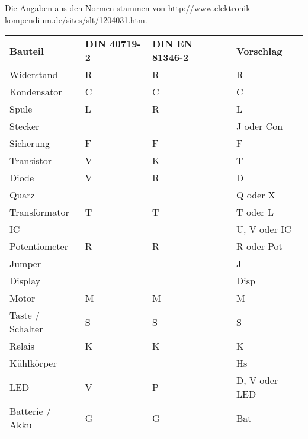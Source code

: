Die Angaben aus den Normen stammen von 
\url{http://www.elektronik-kompendium.de/sites/slt/1204031.htm}. 
\begin{table}[h!]
  \begin{tabular}{llll}
  \rowcolor{white}  \textbf{Bauteil} 	    
                                            & \textbf{DIN 40719-2} 
                                                    & \textbf{DIN EN 81346-2}          
                                                            & \textbf{Vorschlag}\\
  \rowcolor{lgray}  Widerstand              & R     & R     & R \\
  \rowcolor{white}  Kondensator             & C     & C     & C \\
  \rowcolor{lgray}  Spule                   & L     & R     & L \\
  \rowcolor{white}  Stecker                 &       &       & J oder Con \\
  \rowcolor{lgray}  Sicherung               & F     & F     & F \\
  \rowcolor{white}  Transistor              & V     & K     & T \\
  \rowcolor{lgray}  Diode                   & V     & R     & D \\
  \rowcolor{white}  Quarz                   &       &       & Q oder X \\
  \rowcolor{lgray}  Transformator           & T     & T     & T oder L \\
  \rowcolor{white}  IC                      &       &       & U, V oder IC \\
  \rowcolor{lgray}  Potentiometer           & R     & R     & R oder Pot \\
  \rowcolor{white}  Jumper                  &       &       & J \\
  \rowcolor{lgray}  Display                 &       &       & Disp \\
  \rowcolor{white}  Motor                   & M     & M     & M \\
  \rowcolor{lgray}  Taste / Schalter        & S     & S     & S \\
  \rowcolor{white}  Relais                  & K     & K     & K \\
  \rowcolor{lgray}  Kühlkörper              &       &       & Hs \\
  \rowcolor{white}  LED                     & V     & P     & D, V oder LED \\
  \rowcolor{lgray}  Batterie / Akku         & G     & G     & Bat \\

\end{tabular}
\end{table}

